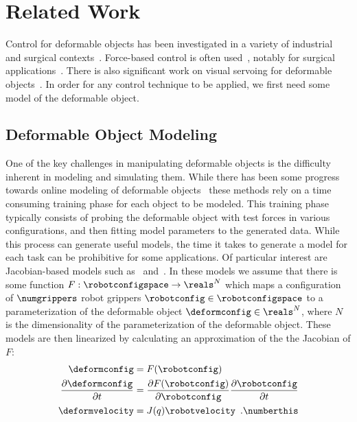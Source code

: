 \section{Related Work}

Control for deformable objects has been investigated in a variety of industrial~\cite{Henrich2000} and surgical contexts~\cite{khalil2010dexterous}. Force-based control is often used~\cite{Remde1999,Kraus1997,Tanner2006}, notably for surgical applications~\cite{Kazanzides1992,Liu2011}. There is also significant work on visual servoing for deformable objects~\cite{Hirai2000,Wada2001,Smolen2009,Navarro-Alarcon2013}. In order for any control technique to be applied, we first need some model of the deformable object.

\subsection{Deformable Object Modeling}

One of the key challenges in manipulating deformable objects is the difficulty inherent in modeling and simulating them. While there has been some progress towards online modeling of deformable objects~\cite{JochenLang2002,Cretu2008a} these methods rely on a time consuming training phase for each object to be modeled. This training phase typically consists of probing the deformable object with test forces in various configurations, and then fitting model parameters to the generated data. While this process can generate useful models, the time it takes to generate a model for each task can be prohibitive for some applications. Of particular interest are Jacobian-based models such as~\cite{Berenson2013} and~\cite{Navarro-Alarcon2013}. In these models we assume that there is some function $F : \robotconfigspace \rightarrow \reals^N$ which maps a configuration of $\numgrippers$ robot grippers $\robotconfig \in \robotconfigspace$ to a parameterization of the deformable object $\deformconfig \in \reals^N$, where $N$ is the dimensionality of the parameterization of the deformable object.  These models are then linearized by calculating an approximation of the the Jacobian of $F$:
\begin{align*}
    \deformconfig                               &= F(\robotconfig) \\
    \frac{\partial \deformconfig}{\partial t}   &= \frac{\partial F(\robotconfig)}{\partial \robotconfig} \frac{\partial \robotconfig}{\partial t} \\
    \deformvelocity                             &= J(q) \robotvelocity \enspace .\numberthis
    \label{eqn:jacobian}
\end{align*}

